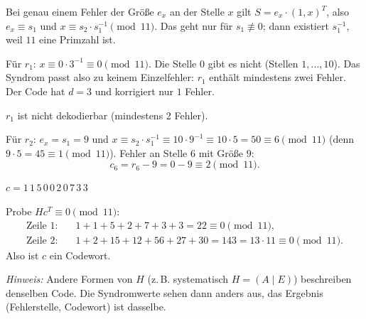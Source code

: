 Bei genau einem Fehler der Größe $e_x$ an der Stelle $x$ gilt $S = e_x \cdot (1, x)^T$,
also $e_x \equiv s_1$ und $x \equiv s_2 \cdot s_1^{-1} \pmod{11}$.
Das geht nur für $s_1 \not\equiv 0$; dann existiert $s_1^{-1}$, weil $11$ eine Primzahl ist.

Für $r_1$: $x \equiv 0 \cdot 3^{-1} \equiv 0 \pmod{11}$. Die Stelle $0$ gibt es nicht (Stellen $1, \dots, 10$).
Das Syndrom passt also zu keinem Einzelfehler: $r_1$ enthält mindestens zwei Fehler.
Der Code hat $d = 3$ und korrigiert nur $1$ Fehler.
\begin{ergebnis} $r_1$ ist nicht dekodierbar (mindestens 2 Fehler). \end{ergebnis}

 Für $r_2$: $e_x = s_1 = 9$ und $x \equiv s_2 \cdot s_1^{-1} \equiv 10 \cdot 9^{-1} \equiv 10 \cdot 5 = 50 \equiv 6 \pmod{11}$
(denn $9 \cdot 5 = 45 \equiv 1 \pmod{11}$). Fehler an Stelle $6$ mit Größe $9$:
\[
c_6 = r_6 - 9 = 0 - 9 \equiv 2 \pmod{11}.
\]
\begin{ergebnis} $c = 1\,1\,5\,0\,0\,2\,0\,7\,3\,3$ \end{ergebnis}

 Probe $H c^T \equiv 0 \pmod{11}$:
\begin{align*}
\text{Zeile 1:}\quad & 1 + 1 + 5 + 2 + 7 + 3 + 3 = 22 \equiv 0 \pmod{11},\\
\text{Zeile 2:}\quad & 1 + 2 + 15 + 12 + 56 + 27 + 30 = 143 = 13 \cdot 11 \equiv 0 \pmod{11}.
\end{align*}
Also ist $c$ ein Codewort. \checkmark

\medskip
{\small\textit{Hinweis:} Andere Formen von $H$ (z.\,B. systematisch $H = (A \mid E)$) beschreiben denselben Code.
Die Syndromwerte sehen dann anders aus, das Ergebnis (Fehlerstelle, Codewort) ist dasselbe.}


